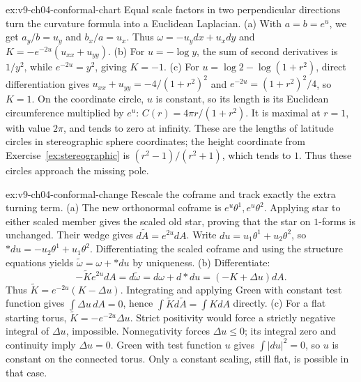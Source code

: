 \begin{solution}{ex:v9-ch04-conformal-chart}
\idea Equal scale factors in two perpendicular directions turn the curvature formula into a Euclidean Laplacian.
\writeup (a) With $a=b=e^u$, we get $a_y/b=u_y$ and $b_x/a=u_x$. Thus $\omega=-u_y dx+u_xdy$ and $K=-e^{-2u}(u_{xx}+u_{yy})$.
(b) For $u=-\log y$, the sum of second derivatives is $1/y^2$, while $e^{-2u}=y^2$, giving $K=-1$.
(c) For $u=\log2-\log(1+r^2)$, direct differentiation gives $u_{xx}+u_{yy}=-4/(1+r^2)^2$ and $e^{-2u}=(1+r^2)^2/4$, so $K=1$. On the coordinate circle, $u$ is constant, so its length is its Euclidean circumference multiplied by $e^u$: $C(r)=4\pi r/(1+r^2)$. It is maximal at $r=1$, with value $2\pi$, and tends to zero at infinity. These are the lengths of latitude circles in stereographic sphere coordinates; the height coordinate from Exercise~\ref{ex:stereographic} is $(r^2-1)/(r^2+1)$, which tends to $1$. Thus these circles approach the missing pole.
\end{solution}

\begin{solution}{ex:v9-ch04-conformal-change}
\idea Rescale the coframe and track exactly the extra turning term.
\writeup (a) The new orthonormal coframe is $e^u\theta^1,e^u\theta^2$. Applying star to either scaled member gives the scaled old star, proving that the star on $1$-forms is unchanged. Their wedge gives $d\tilde A=e^{2u}dA$. Write $du=u_1\theta^1+u_2\theta^2$, so $\ast du=-u_2\theta^1+u_1\theta^2$. Differentiating the scaled coframe and using the structure equations yields $\tilde\omega=\omega+\ast du$ by uniqueness.
(b) Differentiate:
\[
-\tilde K e^{2u}dA=d\tilde\omega
=d\omega+d\ast du=(-K+\Delta u)dA.
\]
Thus $\tilde K=e^{-2u}(K-\Delta u)$. Integrating and applying Green with constant test function gives $\int\Delta u\,dA=0$, hence $\int\tilde Kd\tilde A=\int KdA$ directly.
(c) For a flat starting torus, $\tilde K=-e^{-2u}\Delta u$. Strict positivity would force a strictly negative integral of $\Delta u$, impossible. Nonnegativity forces $\Delta u\le0$; its integral zero and continuity imply $\Delta u=0$. Green with test function $u$ gives $\int|du|^2=0$, so $u$ is constant on the connected torus. Only a constant scaling, still flat, is possible in that case.
\end{solution}


